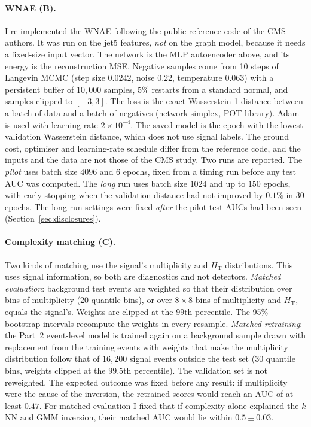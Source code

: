 \documentclass[11pt,a4paper]{article}
\newcommand{\HT}{\ensuremath{H_\mathrm{T}}\xspace}
\begin{document}
\paragraph{WNAE (B).}
I re-implemented the WNAE following the public reference code of the CMS authors. It was run on
the jet5 features, \emph{not} on the graph model, because it needs a fixed-size input vector. The
network is the MLP autoencoder above, and its energy is the reconstruction MSE. Negative samples
come from 10 steps of Langevin MCMC (step size $0.0242$, noise $0.22$, temperature $0.063$) with a
persistent buffer of $10{,}000$ samples, $5\%$ restarts from a standard normal, and samples
clipped to $[-3,3]$. The loss is the exact Wasserstein-1 distance between a batch of data and a batch of
negatives (network simplex, POT library). Adam is used with learning rate $2\times10^{-4}$. The
saved model is the epoch with the lowest validation Wasserstein distance, which does not use signal
labels. The ground cost, optimiser and learning-rate schedule differ from the reference code, and
the inputs and the data are not those of the CMS study. Two runs are reported. The \emph{pilot} uses
batch size $4096$ and $6$ epochs, fixed from a timing run before any test AUC was computed. The
\emph{long} run uses batch size $1024$ and up to $150$ epochs, with early stopping when the
validation distance had not improved by $0.1\%$ in $30$ epochs. The long-run settings were fixed
\emph{after} the pilot test AUCs had been seen (Section~\ref{sec:disclosures}).

\paragraph{Complexity matching (C).}
Two kinds of matching use the signal's multiplicity and \HT distributions. This uses signal
information, so both are diagnostics and not detectors.
\emph{Matched evaluation}: background test events are weighted so that their distribution
over bins of multiplicity (20 quantile bins), or over $8\times8$ bins of multiplicity and \HT,
equals the signal's. Weights are clipped at the 99th percentile. The 95\% bootstrap intervals
recompute the weights in every resample.
\emph{Matched retraining}: the Part~2 event-level model is trained again on a background sample
drawn with replacement from the training events with weights that make the multiplicity
distribution follow that of $16{,}200$ signal events outside the test set ($30$ quantile bins,
weights clipped at the $99.5$th percentile). The validation set is not reweighted.
The expected outcome was fixed before any result: if multiplicity were the cause of the inversion,
the retrained scores would reach an AUC of at least $0.47$. For matched evaluation I fixed that if
complexity alone explained the $k$NN and GMM inversion, their matched AUC would lie within
$0.5\pm0.03$.
\end{document}
